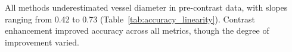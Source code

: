 %
%
%
All methods underestimated vessel diameter in pre-contrast data, with slopes ranging from 0.42 to 0.73 (Table~\ref{tab:accuracy_linearity}). Contrast enhancement improved accuracy across all metrics, though the degree of improvement varied. 

